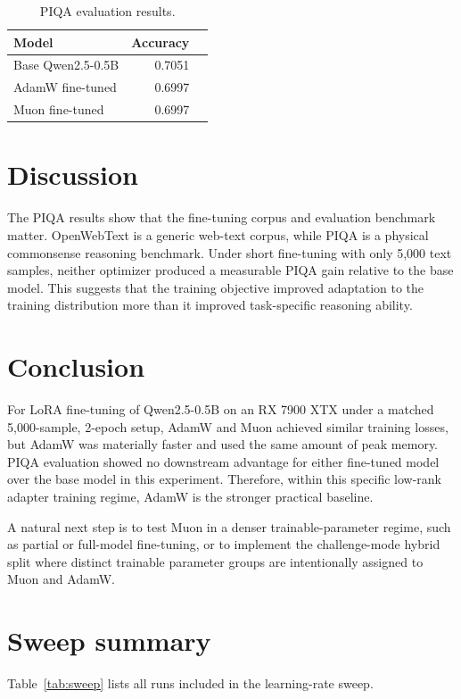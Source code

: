 \documentclass[11pt]{article}
\begin{document}
\begin{table}[H]
\centering
\caption{PIQA evaluation results.}
\label{tab:piqa}
\begin{tabular}{lrr}
\toprule
Model & Accuracy \\
\midrule
Base Qwen2.5-0.5B & 0.7051 \\
AdamW fine-tuned & 0.6997 \\
Muon fine-tuned & 0.6997 \\
\bottomrule
\end{tabular}
\end{table}

\section{Discussion}
The PIQA results show that the fine-tuning corpus and evaluation benchmark matter.
OpenWebText is a generic web-text corpus, while PIQA is a physical commonsense reasoning benchmark.
Under short fine-tuning with only 5,000 text samples, neither optimizer produced a measurable PIQA gain relative to the base model.
This suggests that the training objective improved adaptation to the training distribution more than it improved task-specific reasoning ability.

\section{Conclusion}
For LoRA fine-tuning of Qwen2.5-0.5B on an RX 7900 XTX under a matched 5,000-sample, 2-epoch setup, AdamW and Muon achieved similar training losses, but AdamW was materially faster and used the same amount of peak memory.
PIQA evaluation showed no downstream advantage for either fine-tuned model over the base model in this experiment.
Therefore, within this specific low-rank adapter training regime, AdamW is the stronger practical baseline.

A natural next step is to test Muon in a denser trainable-parameter regime, such as partial or full-model fine-tuning, or to implement the challenge-mode hybrid split where distinct trainable parameter groups are intentionally assigned to Muon and AdamW.

\appendix
\section{Sweep summary}
Table~\ref{tab:sweep} lists all runs included in the learning-rate sweep.
\end{document}
